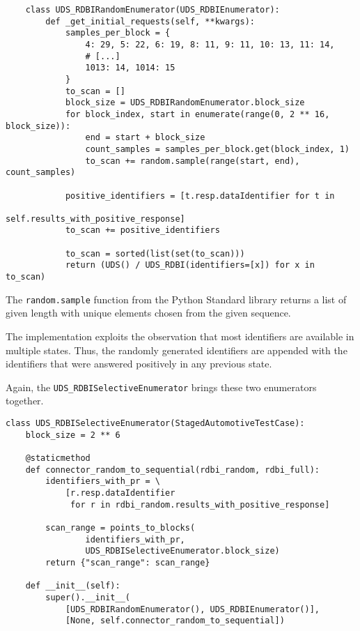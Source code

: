 \begin{samepage}
\begin{verbatim}
    class UDS_RDBIRandomEnumerator(UDS_RDBIEnumerator):
        def _get_initial_requests(self, **kwargs):
            samples_per_block = {
                4: 29, 5: 22, 6: 19, 8: 11, 9: 11, 10: 13, 11: 14,
                # [...]
                1013: 14, 1014: 15
            }
            to_scan = []
            block_size = UDS_RDBIRandomEnumerator.block_size
            for block_index, start in enumerate(range(0, 2 ** 16, block_size)):
                end = start + block_size
                count_samples = samples_per_block.get(block_index, 1)
                to_scan += random.sample(range(start, end), count_samples)

            positive_identifiers = [t.resp.dataIdentifier for t in
                                    self.results_with_positive_response]
            to_scan += positive_identifiers

            to_scan = sorted(list(set(to_scan)))
            return (UDS() / UDS_RDBI(identifiers=[x]) for x in to_scan)
\end{verbatim}
\end{samepage}

The \texttt{random.sample} function from the Python Standard library returns a list of given length with unique elements chosen from the given sequence.

The implementation exploits the observation that most identifiers are available in multiple states. Thus, the randomly generated identifiers are appended with the identifiers that were answered positively in any previous state.

Again, the \texttt{UDS_RDBISelectiveEnumerator} brings these two enumerators together.

\begin{samepage}
\begin{verbatim}
class UDS_RDBISelectiveEnumerator(StagedAutomotiveTestCase):
    block_size = 2 ** 6

    @staticmethod
    def connector_random_to_sequential(rdbi_random, rdbi_full):
        identifiers_with_pr = \
            [r.resp.dataIdentifier
             for r in rdbi_random.results_with_positive_response]

        scan_range = points_to_blocks(
                identifiers_with_pr,
                UDS_RDBISelectiveEnumerator.block_size)
        return {"scan_range": scan_range}

    def __init__(self):
        super().__init__(
            [UDS_RDBIRandomEnumerator(), UDS_RDBIEnumerator()],
            [None, self.connector_random_to_sequential])
\end{verbatim}
\end{samepage}

